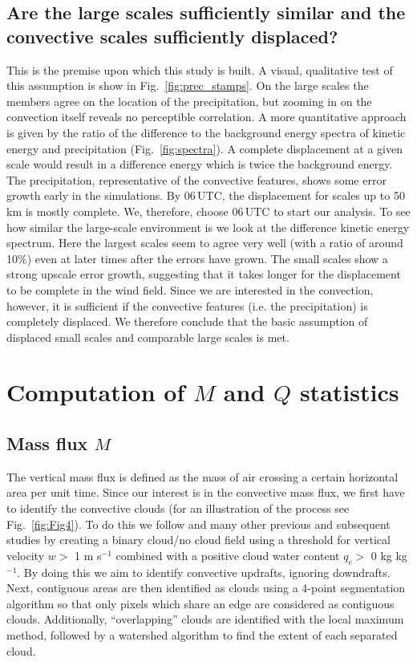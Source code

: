 \documentclass[a4paper, 12pt]{article}
\begin{document}
\subsection{Are the large scales sufficiently similar and the convective scales sufficiently displaced?} 
This is the premise upon which this study is built. A visual, qualitative test of this assumption is show in Fig.~\ref{fig:prec_stamps}. On the large scales the members agree on the location of the precipitation, but zooming in on the convection itself reveals no perceptible correlation. A more quantitative approach is given by the ratio of the difference to the background energy spectra of kinetic energy and precipitation (Fig.~\ref{fig:spectra}). A complete displacement at a given scale would result in a difference energy which is twice the background energy. The precipitation, representative of the convective features, shows some error growth early in the simulations. By 06\,UTC, the displacement for scales up to 50\,km is mostly complete. We, therefore, choose 06\,UTC to start our analysis. To see how similar the large-scale environment is we look at the difference kinetic energy spectrum. Here the largest scales seem to agree very well (with a ratio of around 10\%) even at later times after the errors have grown. The small scales show a strong upscale error growth, suggesting that it takes longer for the displacement to be complete in the wind field. Since we are interested in the convection, however, it is sufficient if the convective features (i.e. the precipitation) is completely displaced. We therefore conclude that the basic assumption of displaced small scales and comparable large scales is met.


\section{Computation of $M$ and $Q$ statistics}

\subsection{Mass flux $M$}
The vertical mass flux is defined as the mass of air crossing a certain horizontal area per unit time. Since our interest is in the convective mass flux, we first have to identify the convective clouds (for an illustration of the process see Fig.~\ref{fig:Fig4}). To do this we follow \cite{Cohen2006} and many other previous and subsequent studies by creating a binary cloud/no cloud field using a threshold for vertical velocity $w >$ 1 m s$^{-1}$ combined with a positive cloud water content $q_c >$ 0 kg kg$^{-1}$. By doing this we aim to identify convective updrafts, ignoring downdrafts. Next, contiguous areas are then identified as clouds using a 4-point segmentation algorithm so that only pixels which share an edge are considered as contiguous clouds. Additionally, ``overlapping'' clouds are identified with the local maximum method, followed by a watershed algorithm to find the extent of each separated cloud.
\end{document}
